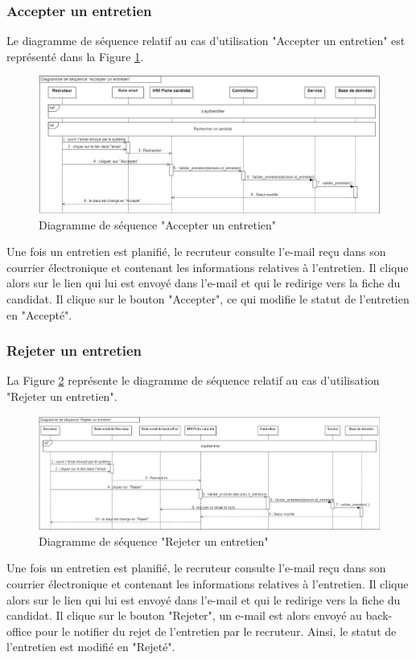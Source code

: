  \subsubsection{Accepter un entretien}
 Le diagramme de séquence relatif au cas d'utilisation "Accepter un entretien" est représenté dans la Figure \ref{fig:sequence_accepter_entretien}.
 \begin{figure}[H]
     \centering
     \includegraphics[scale=0.51]{img/sequence accepter entretien.png}
     \caption{Diagramme de séquence "Accepter un entretien"}
     \label{fig:sequence_accepter_entretien}
 \end{figure}
 Une fois un entretien est planifié, le recruteur consulte l'e-mail reçu dans son courrier électronique et contenant les informations relatives à l'entretien. Il clique alors sur le lien qui lui est envoyé dans l'e-mail et qui le redirige vers la fiche du candidat. Il clique sur le bouton "Accepter", ce qui modifie le statut de l'entretien en "Accepté".
 \subsubsection{Rejeter un entretien}
 La Figure \ref{fig:sequence_refuser_entretien} représente le diagramme de séquence relatif au cas d'utilisation "Rejeter un entretien".
 \begin{figure}[H]
     \centering
     \includegraphics[scale=0.4]{img/sequence refuser entretien.png}
     \caption{Diagramme de séquence "Rejeter un entretien"}
     \label{fig:sequence_refuser_entretien}
 \end{figure}
   Une fois un entretien est planifié, le recruteur consulte l'e-mail reçu dans son courrier électronique et contenant les informations relatives à l'entretien. Il clique alors sur le lien qui lui est envoyé dans l'e-mail et qui le redirige vers la fiche du candidat. Il clique sur le bouton "Rejeter", un e-mail est alors envoyé au back-office pour le notifier du rejet de l'entretien par le recruteur. Ainsi, le statut de l'entretien est modifié en "Rejeté".
